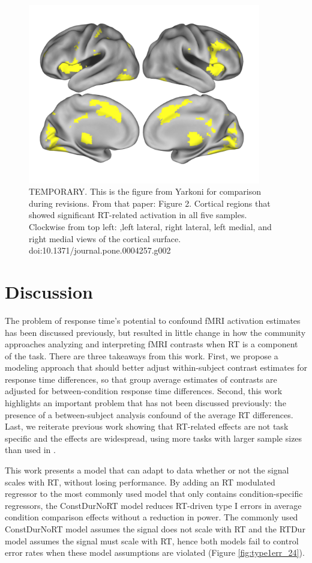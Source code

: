 \documentclass[titlepage,12pt] {article}
\begin{document}
\begin{figure}
  \centering
   \includegraphics[width=4in]{Figures/temporary_fig_from_yarkoni.pdf}
   \caption{TEMPORARY.  This is the figure from Yarkoni for comparison during revisions. From that paper: Figure 2. Cortical regions that showed significant RT-related activation in all five samples. Clockwise from top left: ,left lateral, right lateral, left medial, and right medial views of the cortical surface. doi:10.1371/journal.pone.0004257.g002}
  \label{fig:conj-yarkoni}
\end{figure}


\section*{Discussion}

The problem of response time's potential to confound fMRI activation estimates has been discussed previously, but  resulted in little change in how the community approaches analyzing and interpreting fMRI contrasts when RT is a component of the task.  There are three takeaways from this work.  First, we propose a modeling approach that should better adjust within-subject contrast estimates for response time differences, so that group average estimates of contrasts are adjusted for between-condition response time differences.  Second, this work highlights an important problem that has not been discussed previously: 
the presence of a between-subject analysis confound of the average RT differences.  Last, we reiterate previous work showing that RT-related effects are not task specific and the effects are widespread, using more tasks with larger sample sizes than used in \citet{yarkoni_bold_2009}.

This work presents a model that can adapt to data whether or not the signal scales with RT, without losing performance. By adding an RT modulated regressor to the most commonly used model that only contains condition-specific regressors, the ConstDurNoRT model reduces RT-driven type I errors in average condition comparison effects without a reduction in power.  The commonly used ConstDurNoRT model assumes the signal does not scale with RT and the RTDur model assumes the signal must scale with RT, hence both models fail to control error rates when these model assumptions are violated (Figure \ref{fig:type1err_24}).  
\end{document}
